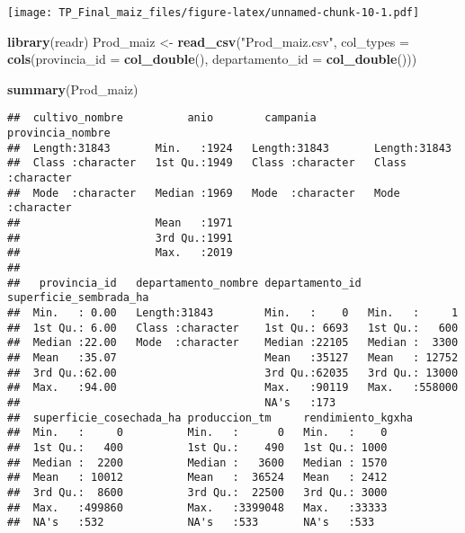 \documentclass[
]{article}
\newenvironment{Shaded}{\begin{snugshade}}{\end{snugshade}}
\newcommand{\AttributeTok}[1]{\textcolor[rgb]{0.13,0.29,0.53}{#1}}
\newcommand{\FunctionTok}[1]{\textcolor[rgb]{0.13,0.29,0.53}{\textbf{#1}}}
\newcommand{\NormalTok}[1]{#1}
\newcommand{\OtherTok}[1]{\textcolor[rgb]{0.56,0.35,0.01}{#1}}
\newcommand{\StringTok}[1]{\textcolor[rgb]{0.31,0.60,0.02}{#1}}
\begin{document}
\texttt{[image: TP\_Final\_maiz\_files/figure-latex/unnamed-chunk-10-1.pdf]}

\begin{Shaded}
\begin{Highlighting}[]
\FunctionTok{library}\NormalTok{(readr)}
\NormalTok{Prod\_maiz }\OtherTok{\textless{}{-}} \FunctionTok{read\_csv}\NormalTok{(}\StringTok{"Prod\_maiz.csv"}\NormalTok{, }\AttributeTok{col\_types =} \FunctionTok{cols}\NormalTok{(}\AttributeTok{provincia\_id =} \FunctionTok{col\_double}\NormalTok{(), }
    \AttributeTok{departamento\_id =} \FunctionTok{col\_double}\NormalTok{()))}
\end{Highlighting}
\end{Shaded}

\begin{Shaded}
\begin{Highlighting}[]
\FunctionTok{summary}\NormalTok{(Prod\_maiz)}
\end{Highlighting}
\end{Shaded}

\begin{verbatim}
##  cultivo_nombre          anio        campania         provincia_nombre  
##  Length:31843       Min.   :1924   Length:31843       Length:31843      
##  Class :character   1st Qu.:1949   Class :character   Class :character  
##  Mode  :character   Median :1969   Mode  :character   Mode  :character  
##                     Mean   :1971                                        
##                     3rd Qu.:1991                                        
##                     Max.   :2019                                        
##                                                                         
##   provincia_id   departamento_nombre departamento_id superficie_sembrada_ha
##  Min.   : 0.00   Length:31843        Min.   :    0   Min.   :     1        
##  1st Qu.: 6.00   Class :character    1st Qu.: 6693   1st Qu.:   600        
##  Median :22.00   Mode  :character    Median :22105   Median :  3300        
##  Mean   :35.07                       Mean   :35127   Mean   : 12752        
##  3rd Qu.:62.00                       3rd Qu.:62035   3rd Qu.: 13000        
##  Max.   :94.00                       Max.   :90119   Max.   :558000        
##                                      NA's   :173                           
##  superficie_cosechada_ha produccion_tm     rendimiento_kgxha
##  Min.   :     0          Min.   :      0   Min.   :    0    
##  1st Qu.:   400          1st Qu.:    490   1st Qu.: 1000    
##  Median :  2200          Median :   3600   Median : 1570    
##  Mean   : 10012          Mean   :  36524   Mean   : 2412    
##  3rd Qu.:  8600          3rd Qu.:  22500   3rd Qu.: 3000    
##  Max.   :499860          Max.   :3399048   Max.   :33333    
##  NA's   :532             NA's   :533       NA's   :533
\end{verbatim}
\end{document}
